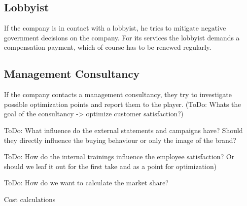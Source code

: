 \documentclass[11pt,titlepage,oneside,openany]{book}
\begin{document}
\subsection{Lobbyist}
If the company is in contact with a lobbyist, he tries to mitigate negative government decisions on the company. For its services the lobbyist demands a compensation payment, which of course has to be renewed regularly.

\subsection{Management Consultancy}
If the company contacts a management consultancy, they try to investigate possible optimization points and report them to the player. (ToDo: Whats the goal of the consultancy -> optimize customer satisfaction?) 

ToDo: What influence do the external statements and campaigns have? Should they directly influence the buying behaviour or only the image of the brand? 

ToDo: How do the internal trainings influence the employee satisfaction? Or should we leaf it out for the first take and as a point for optimization) 

ToDo: How do we want to calculate the market share? 

Cost calculations 
\end{document}
